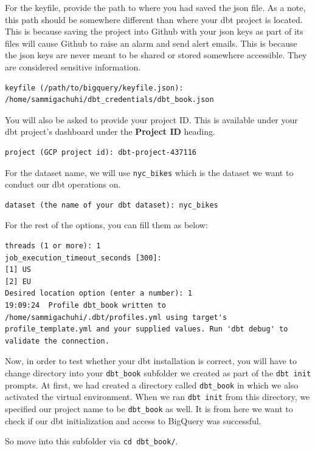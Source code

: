 \documentclass[
]{book}
\begin{document}
For the keyfile, provide the path to where you had saved the json file. As a note, this path should be somewhere different than where your dbt project is located. This is because saving the project into Github with your json keys as part of its files will cause Github to raise an alarm and send alert emails. This is because the json keys are never meant to be shared or stored somewhere accessible. They are considered sensitive information.

\begin{verbatim}
keyfile (/path/to/bigquery/keyfile.json): /home/sammigachuhi/dbt_credentials/dbt_book.json
\end{verbatim}

You will also be asked to provide your project ID. This is available under your dbt project's dashboard under the \textbf{Project ID} heading.

\begin{verbatim}
project (GCP project id): dbt-project-437116
\end{verbatim}

For the dataset name, we will use \texttt{nyc\_bikes} which is the dataset we want to conduct our dbt operations on.

\begin{verbatim}
dataset (the name of your dbt dataset): nyc_bikes
\end{verbatim}

For the rest of the options, you can fill them as below:

\begin{verbatim}
threads (1 or more): 1
job_execution_timeout_seconds [300]: 
[1] US
[2] EU
Desired location option (enter a number): 1
19:09:24  Profile dbt_book written to /home/sammigachuhi/.dbt/profiles.yml using target's profile_template.yml and your supplied values. Run 'dbt debug' to validate the connection.
\end{verbatim}

Now, in order to test whether your dbt installation is correct, you will have to change directory into your \texttt{dbt\_book} subfolder we created as part of the \texttt{dbt\ init} prompts. At first, we had created a directory called \texttt{dbt\_book} in which we also activated the virtual environment. When we ran \texttt{dbt\ init} from this directory, we specified our project name to be \texttt{dbt\_book} as well. It is from here we want to check if our dbt initialization and access to BigQuery was successful.

So move into this subfolder via \texttt{cd\ dbt\_book/}.
\end{document}

